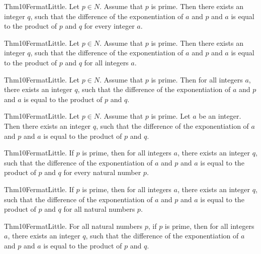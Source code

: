 \documentclass{article}
\begin{document}
Thm10FermatLittle. Let $p \in N$. Assume that $p$ is prime. Then there exists an integer $q$, such that the difference of the exponentiation of $a$ and $p$ and $a$ is equal to the product of $p$ and $q$ for every integer $a$.

Thm10FermatLittle. Let $p \in N$. Assume that $p$ is prime. Then there exists an integer $q$, such that the difference of the exponentiation of $a$ and $p$ and $a$ is equal to the product of $p$ and $q$ for all integers $a$.

Thm10FermatLittle. Let $p \in N$. Assume that $p$ is prime. Then for all integers $a$, there exists an integer $q$, such that the difference of the exponentiation of $a$ and $p$ and $a$ is equal to the product of $p$ and $q$.

Thm10FermatLittle. Let $p \in N$. Assume that $p$ is prime. Let $a$ be an integer. Then there exists an integer $q$, such that the difference of the exponentiation of $a$ and $p$ and $a$ is equal to the product of $p$ and $q$.

Thm10FermatLittle. If $p$ is prime, then for all integers $a$, there exists an integer $q$, such that the difference of the exponentiation of $a$ and $p$ and $a$ is equal to the product of $p$ and $q$ for every natural number $p$.

Thm10FermatLittle. If $p$ is prime, then for all integers $a$, there exists an integer $q$, such that the difference of the exponentiation of $a$ and $p$ and $a$ is equal to the product of $p$ and $q$ for all natural numbers $p$.

Thm10FermatLittle. For all natural numbers $p$, if $p$ is prime, then for all integers $a$, there exists an integer $q$, such that the difference of the exponentiation of $a$ and $p$ and $a$ is equal to the product of $p$ and $q$.
\end{document}
